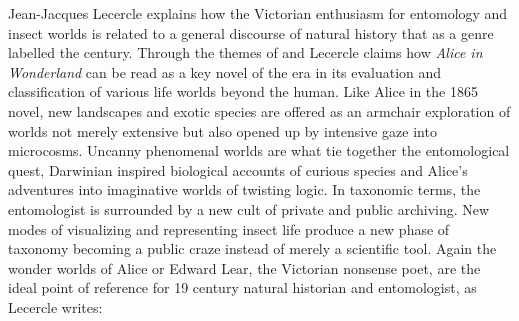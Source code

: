 {Jean{}-Jacques Lecercle explains how the Victorian enthusiasm for
entomology and insect worlds is related to a general discourse of
natural history that as a genre labelled the century. Through the
themes of  and  Lecercle claims how
{\em Alice in Wonderland} can be read as a key novel of the era in
its evaluation and classification of various life worlds beyond the
human. Like Alice in the 1865 novel, new landscapes and exotic species
are offered as an armchair exploration of worlds not merely extensive
but also opened up by intensive gaze into microcosms. Uncanny
phenomenal worlds are what tie together the entomological quest,
Darwinian inspired biological accounts of curious species and Alice's
adventures into imaginative worlds of twisting logic. In taxonomic
terms, the entomologist is surrounded by a new cult of private and
public archiving. New modes of visualizing and representing insect life
produce a new phase of taxonomy becoming a public craze instead of
merely a scientific tool. Again the wonder worlds of Alice or Edward
Lear, the Victorian nonsense poet, are the ideal point of reference for
19 century natural historian and entomologist, as Lecercle 
writes:


}
